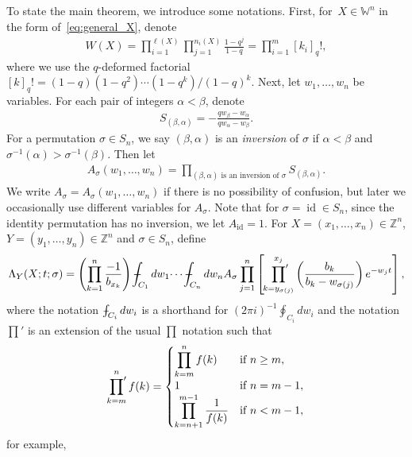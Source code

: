 \documentclass[11pt]{article}
\numberwithin{equation}{section}
\def\Xint#1{\mathchoice
{\XXint\displaystyle\textstyle{#1}}%
{\XXint\textstyle\scriptstyle{#1}}%
{\XXint\scriptstyle\scriptscriptstyle{#1}}%
{\XXint\scriptscriptstyle\scriptscriptstyle{#1}}%
\!\int}
\def\XXint#1#2#3{{\setbox0=\hbox{$#1{#2#3}{\int}$}
\vcenter{\hbox{$#2#3$}}\kern-.5\wd0}}
\def\dashint{\Xint-}
\newcommand{\intZ}{\mathbb{Z}}
\newcommand{\prodprime}{\sideset{}{'}\prod}
\newcommand{\Weylchamber}{\mathbb{W}}
\DeclareMathOperator{\id}{id}
\begin{document}
To state the main theorem, we introduce some notations. First, for~$X \in \Weylchamber^n$ in the form of~\eqref{eq:general_X}, denote
\begin{gather*}
 W(X) = \prod^{\ell(X)}_{i = 1} \prod^{n_i(X)}_{j = 1} \frac{1 - q^j}{1 - q} = \prod^m_{i = 1} [k_i]_q!,
\end{gather*}
where we use the $q$-deformed factorial $[k]_q! = (1 - q)(1 - q^2) \dotsb (1 - q^k)/(1 - q)^k$. Next, let $w_1, \dotsc, w_n$ be variables. For each pair of integers $\alpha < \beta$, denote
\begin{gather*}
 S_{(\beta, \alpha)} = -\frac{q w_{\beta} - w_{\alpha}}{q w_{\alpha} - w_{\beta}}.
\end{gather*}
For a permutation $\sigma \in S_n$, we say $(\beta, \alpha)$ is an \emph{inversion} of $\sigma$ if $\alpha < \beta$ and $\sigma^{-1}(\alpha) > \sigma^{-1}(\beta)$. Then let
\begin{gather*}
 A_{\sigma}(w_1, \dotsc, w_n) = \prod_{(\beta, \alpha) \text{ is an inversion of } \sigma} S_{(\beta, \alpha)}.
\end{gather*}
We write $A_{\sigma} = A_{\sigma}(w_1, \dotsc, w_n)$ if there is no possibility of confusion, but later we occasionally use dif\/ferent variables for $A_{\sigma}$. Note that for $\sigma = \id \in S_n$, since the identity permutation has no inversion, we let $A_{\id} = 1$. For $X = (x_1, \dotsc, x_n) \in \intZ^n$, $Y = (y_1, \dotsc, y_n) \in \intZ^n$ and $\sigma \in S_n$, def\/ine
\begin{gather} \label{eq:integral_Lambda}
 \Lambda_Y(X; t; \sigma) = \left( \prod^n_{k = 1} \frac{-1}{b_{x_k}} \right) \dashint_{C_1} dw_1 \dotsi \dashint_{C_n} dw_n A_{\sigma} \prod^n_{j = 1} \left[ \prodprime^{x_j}_{k = y_{\sigma(j)}} \left( \frac{b_k}{b_k - w_{\sigma(j)}} \right) e^{-w_j t} \right],
\end{gather}
where the notation $\dashint_{C_i} dw_i$ is a shorthand for $(2\pi i)^{-1} \oint_{C_i} dw_i$ and the notation $\prod'$ is an extension of the usual $\prod$ notation such that
\begin{gather*}
 \prodprime^n_{k = m} f(k) =
 \begin{cases}
 \displaystyle \prod^n_{k = m} f(k) & \text{if $n \geq m$}, \\
 1 & \text{if $n = m - 1$}, \\
\displaystyle \prod^{m - 1}_{k = n + 1} \frac{1}{f(k)} & \text{if $n < m - 1$},
 \end{cases}
\end{gather*}
for example, %
\end{document}
